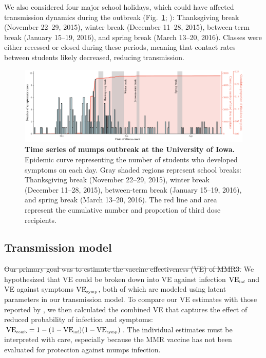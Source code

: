 \documentclass[12pt]{article}
\newcommand{\fref}[1]{Fig.~\ref{fig:#1}}
\providecommand{\DIFaddtex}[1]{{\protect\color{blue}\uwave{#1}}} %
\providecommand{\DIFdeltex}[1]{{\protect\color{red}\sout{#1}}}                      %
\providecommand{\DIFaddbegin}{} %
\providecommand{\DIFaddend}{} %
\providecommand{\DIFdelbegin}{} %
\providecommand{\DIFdelend}{} %
\providecommand{\DIFadd}[1]{\texorpdfstring{\DIFaddtex{#1}}{#1}} %
\providecommand{\DIFdel}[1]{\texorpdfstring{\DIFdeltex{#1}}{}} %
\newcommand{\DIFscaledelfig}{0.5}
\newlength{\DIFdelgraphicswidth} %
\newlength{\DIFdelgraphicsheight} %
\newcommand{\DIFaddincludegraphics}[2][]{{\color{blue}\fbox{\DIFOincludegraphics[#1]{#2}}}} %
\newcommand{\DIFdelincludegraphics}[2][]{%
\sbox{\DIFdelgraphicsbox}{\DIFOincludegraphics[#1]{#2}}%
\settoboxwidth{\DIFdelgraphicswidth}{\DIFdelgraphicsbox} %
\settoboxtotalheight{\DIFdelgraphicsheight}{\DIFdelgraphicsbox} %
\scalebox{\DIFscaledelfig}{%
\parbox[b]{\DIFdelgraphicswidth}{\usebox{\DIFdelgraphicsbox}\\[-\baselineskip] \rule{\DIFdelgraphicswidth}{0em}}\llap{\resizebox{\DIFdelgraphicswidth}{\DIFdelgraphicsheight}{%
\setlength{\unitlength}{\DIFdelgraphicswidth}%
\begin{picture}(1,1)%
\thicklines\linethickness{2pt} %
{\color[rgb]{1,0,0}\put(0,0){\framebox(1,1){}}}%
{\color[rgb]{1,0,0}\put(0,0){\line( 1,1){1}}}%
{\color[rgb]{1,0,0}\put(0,1){\line(1,-1){1}}}%
\end{picture}%
}\hspace*{3pt}}} %
} %
\DeclareRobustCommand{\DIFaddbegin}{\DIFOaddbegin \let\includegraphics\DIFaddincludegraphics} %
\DeclareRobustCommand{\DIFaddend}{\DIFOaddend \let\includegraphics\DIFOincludegraphics} %
\DeclareRobustCommand{\DIFdelbegin}{\DIFOdelbegin \let\includegraphics\DIFdelincludegraphics} %
\DeclareRobustCommand{\DIFdelend}{\DIFOaddend \let\includegraphics\DIFOincludegraphics} %
\begin{document}
We also considered four major school holidays, which could have affected transmission dynamics during the outbreak (\fref{data}; \cite{iowa}): 
Thanksgiving break (November 22--29, 2015), winter break (December 11--28, 2015), between-term break (January 15--19, 2016), and spring break (March 13--20, 2016).
Classes were either recessed or closed during these periods, meaning that contact rates between students likely decreased, reducing transmission.

\begin{figure}[!th]
\includegraphics[width=\textwidth]{../figure/time_series.pdf}
\caption{
\textbf{Time series of mumps outbreak at the University of Iowa.}
Epidemic curve representing the number of students who developed symptoms on each day.
Gray shaded regions represent school breaks: Thanksgiving break (November 22--29, 2015), winter break (December 11--28, 2015), between-term break (January 15--19, 2016), and spring break (March 13--20, 2016).
The red line and area represent the cumulative number and proportion of third dose recipients.
}
\label{fig:data}
\end{figure}

\subsection{Transmission model}

\DIFdelbegin \DIFdel{Our primary goal was to estimate the vaccine effectiveness (VE) of MMR3.
}\DIFdelend We hypothesized that VE \DIFaddbegin \DIFadd{for MMR3 }\DIFaddend could be broken down into VE against infection $\mathrm{VE}_{\textrm{\tiny{inf}}}$ and VE against symptoms $\mathrm{VE}_{\textrm{\tiny{symp}}}$, both of which are modeled using latent parameters in our transmission model.
To compare our VE estimates with those reported by \cite{cardemil2017effectiveness}, we then calculated the combined VE that captures the effect of reduced probability of infection and symptoms: $\mathrm{VE}_{\textrm{\tiny{comb}}} = 1 - (1 - \mathrm{VE}_{\textrm{\tiny{inf}}})(1- \mathrm{VE}_{\textrm{\tiny{symp}}})$.
The individual estimates must be interpreted with care, especially because the MMR vaccine has not been evaluated for protection against mumps infection. 
\end{document}
